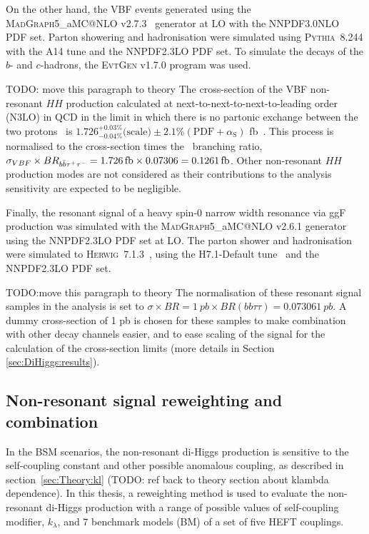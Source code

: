 On the other hand, the VBF events generated using the
\textsc{MadGraph}5\_aMC@NLO v2.7.3~\cite{Alwall:2014hca} generator at LO 
with the \textsc{NNPDF3.0NLO}~\cite{Ball:2014uwa} PDF set.
Parton showering and hadronisation were simulated using \textsc{Pythia~8.244}
with the A14 tune and the \textsc{NNPDF2.3LO} PDF set.
To simulate the decays of the $b$- and $c$-hadrons,
the \textsc{EvtGen} v1.7.0 program was used.

TODO: move this paragraph to theory
The cross-section of the VBF non-resonant $HH$ production calculated at
next-to-next-to-next-to-leading order (N3LO) in QCD in the limit 
in which there is no partonic exchange between the two protons~\cite{Dreyer:2018qbw} is
$1.726^{+0.03\%}_{-0.04\%}\text{(scale)}\pm 2.1\%(\text{PDF}+\alpha_\text{S})$ fb~\cite{dihiggs-twiki}.
This process is normalised to the cross-section times the \bbtautau\ branching ratio, \linebreak[2]
\mbox{$\sigma_{VBF} \times BR_{b\bar{b}\tau^{+}\tau^{-}}  = \SI{1.726}{fb} \times 0.07306  =  \SI{0.1261}{fb}$.}  
Other non-resonant $HH$ production modes are not considered as their contributions
to the analysis sensitivity are expected to be negligible.



Finally, the resonant signal  
of a heavy spin-0 narrow width resonance via ggF production 
was simulated with the \textsc{MadGraph}5\_aMC@NLO v2.6.1 
generator using the \textsc{NNPDF2.3LO} PDF
set at LO.
The parton shower and hadronisation were simulated to
\textsc{Herwig~7.1.3}~\cite{Bahr:2008pv,Bellm:2015jjp},
using the H7.1-Default tune~\cite{Gieseke:2012ft}
and the \textsc{NNPDF2.3LO} PDF set.


TODO:move this paragraph to theory
The normalisation of these resonant signal samples in the analysis is set to \linebreak[2]
\mbox{$\sigma \times BR  = \SI{1}{pb} \times BR (bb \tau \tau)  =  0.07306 \SI{1}{pb}$.} 
A dummy cross-section of 1 pb is chosen for these samples 
to make combination with other decay channels easier, 
and to ease scaling of the signal 
for the calculation of the cross-section limits 
(more details in Section \ref{sec:DiHiggs:results}).

\subsection{Non-resonant signal reweighting and combination}
In the BSM scenarios, the non-resonant di-Higgs production is sensitive 
to the self-coupling constant and other possible anomalous coupling,
as described in section~\ref{sec:Theory:kl} 
(TODO: ref back to theory section about klambda dependence).
In this thesis, a reweighting method is used to evaluate
the non-resonant di-Higgs production with a range of possible 
values of self-coupling modifier, $k_\lambda$, and 7 benchmark models (BM)
of a set of five HEFT couplings. 
